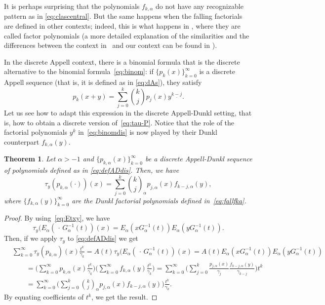 \documentclass[11pt]{article}
\theoremstyle{plain}
\newtheorem{theorem}{Theorem}[section]
\theoremstyle{remark}
\numberwithin{equation}{section} %
\newcommand{\Ea}{E_{\alpha}}
\newcommand{\binoma}[2]{\binom{#1}{#2}_{\!\alpha}}
\newcommand{\cc}{\gamma}
\begin{document}
It is perhaps surprising that the polynomials $f_{k,\alpha}$ do not have any 
recognizable pattern as in \eqref{eq:clascentral}.
But the same happens when the falling factorials are defined in other contexts;
indeed, this is what happens in \cite[\S\,18]{Cho},
where they are called factor polynomials
(a more detailed explanation of the similarities and the differences
between the context in~\cite{Cho} and our context can be found 
in \cite[Remark~1]{CMV}).

In the discrete Appell context, there is a binomial formula that is the discrete alternative to the binomial formula~\eqref{eq:binom}: 
if $\{p_k(x)\}_{k=0}^{\infty}$ is a discrete Appell
sequence (that is, it is defined as in \eqref{eq:dAs}), they satisfy
\begin{equation}
\label{eq:binomdis}
  p_k(x+y) = \sum_{j=0}^k \binom{k}{j} p_j(x)y^{\underline{k-j}}.
\end{equation}
Let us see how to adapt this expression in the discrete Appell-Dunkl setting, that is, how to obtain a discrete version of~\eqref{eq:tau-P}.
Notice that the role of the factorial polynomials $y^{\underline{k}}$ in~\eqref{eq:binomdis} is now played by their Dunkl counterpart $f_{k,\alpha}(y)$.

\begin{theorem}
Let $\alpha>-1$ and $\{p_{k,\alpha}(x)\}_{k=0}^{\infty}$ be a discrete Appell-Dunkl sequence of polynomials 
defined as in \eqref{eq:defADdis}. Then, we have
\[
   \tau_y(p_{k,\alpha}(\cdot))(x)
  = \sum_{j=0}^k \binoma{k}{j} p_{j,\alpha}(x) f_{k-j,\alpha}(y),
\]
where $\{f_{k,\alpha}(y)\}_{k=0}^{\infty}$ are the Dunkl factorial polynomials defined in~\eqref{eq:fallfka}.
\end{theorem}

\begin{proof}
By using~\eqref{eq:Etxy}, we have
\[
  \tau_y(\Ea(\,\cdot\, G_\alpha^{-1}(t))(x) 
  = \Ea(xG_\alpha^{-1}(t)) \Ea (yG_\alpha^{-1}(t)).
\]
Then, if we apply $\tau_y$ to \eqref{eq:defADdis} we get
\begin{align*}
  &\sum_{k=0}^{\infty} \tau_y(p_{k,\alpha})(x) \frac{t^k}{\cc_{k}}
  = A(t) \tau_y(\Ea(\,\cdot\, G_\alpha^{-1}(t))(x)
  = A(t) \Ea(xG_\alpha^{-1}(t)) \Ea (yG_\alpha^{-1}(t)) \\
  &\qquad= \bigg(\sum_{k=0}^{\infty} p_{k,\alpha}(x) \frac{t^k}{\cc_{k}}\bigg)
  \bigg(\sum_{k=0}^{\infty} f_{k,\alpha}(y) \frac{t^k}{\cc_{k}}\bigg) 
  = \sum_{k=0}^{\infty} \bigg( \sum_{j=0}^k \frac{p_{j,\alpha}(x)}{\cc_{j}} 
    \frac{f_{k-j,\alpha}(y)}{\cc_{k-j}} \bigg) t^k \\
  &\qquad= \sum_{k=0}^{\infty} \bigg( \sum_{j=0}^k \binoma{k}{j} p_{j,\alpha}(x) 
    f_{k-j,\alpha}(y) \bigg) \frac{t^k}{\cc_{k}}.
\end{align*}
By equating coefficients of $t^k$, we get the result.
\end{proof}
\end{document}
